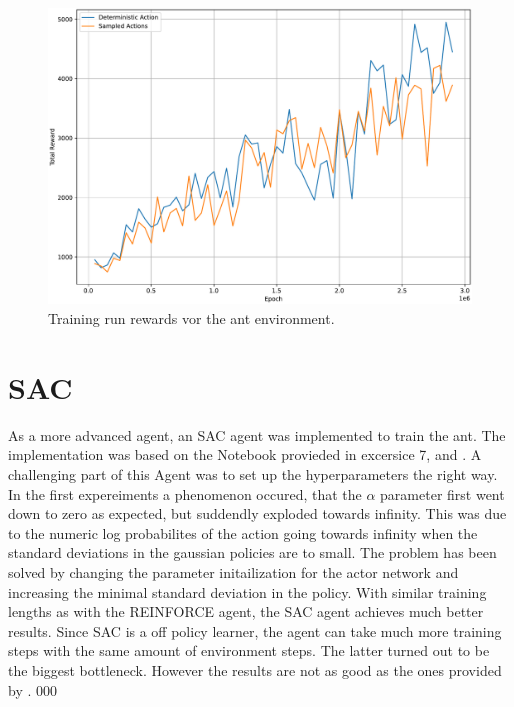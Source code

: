 \documentclass[11pt, a4paper]{article}
\begin{document}
\begin{figure}
    \centering
    \includegraphics[width=15cm]{stoc_det.pdf}
    \caption{Training run rewards vor the ant environment.}
    \label{SAC:test1}
\end{figure}

\newpage
\section{SAC}
As a more advanced agent, an SAC agent was implemented to train the ant.
The implementation was based on the Notebook provieded in excersice 7, and \cite{haarnoja2018soft}.
A challenging part of this Agent was to set up the hyperparameters the right way. 
In the first expereiments a phenomenon occured, that the $\alpha$ parameter first went down to zero as 
expected, but suddendly exploded towards infinity. 
This was due to the numeric log probabilites of the action going towards infinity when the standard deviations 
in the gaussian policies are to small. 
The problem has been solved by changing the parameter initailization for the actor network and increasing the minimal
standard deviation in the policy.
With similar training lengths as with the REINFORCE agent, the SAC agent achieves much better results.
Since SAC is a off policy learner, the agent can take much more training steps with the same amount of environment steps.
The latter turned out to be the biggest bottleneck.
However the results are not as good as the ones provided by \cite{haarnoja2018soft}.
000

{}

\end{document}
